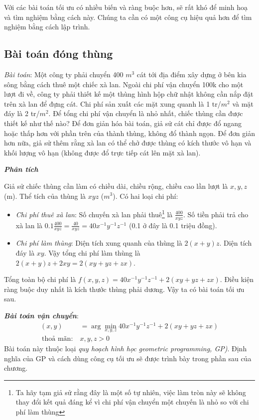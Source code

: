 Với các bài toán tối ưu có nhiều biến và ràng buộc hơn, sẽ rất khó để
minh hoạ và tìm nghiệm bằng cách này. Chúng ta cần có một công cụ hiệu quả hơn để tìm nghiệm bằng cách lập trình.

\subsection{Bài toán đóng thùng}
 
\textit{Bài toán}: Một công ty phải chuyển 400 $m^3$ cát tới địa điểm xây dựng ở
bên kia sông bằng
cách thuê một chiếc xà lan. Ngoài chi phí vận chuyển 100k cho một lượt đi về, công ty  phải thiết kế một thùng hình hộp chữ nhật không cần nắp đặt trên xà
lan để đựng cát. Chi phí sản xuất các mặt xung quanh
là 1 tr/$m^2$ và mặt đáy là 2 tr/$m^2$. Để tổng chi phí vận chuyển là nhỏ nhất, chiếc thùng cần được thiết kế như thế nào? Để đơn giản hóa bài toán, giả sử cát chỉ được
đổ ngang hoặc thấp hơn với phần trên của thành thùng, không đổ thành ngọn. Để đơn giản hơn nữa, giả sử thêm rằng xà lan có thể chở được thùng có kích thước vô hạn và khối lượng vô hạn (không được đổ trực tiếp cát lên mặt xà lan). 
 
 
\textit{\textbf{Phân tích}}

Giả sử chiếc thùng cần làm có chiều dài, chiều rộng, chiều cao lần lượt là $x,
y, z$ (m). Thể tích của thùng là $xyz$ ($m^3$). Có hai loại chi phí:
\begin{itemize}
    \item \textit{Chi phí thuê xà lan}: Số chuyến xà lan phải thuê\footnote{Ta
    hãy tạm giả sử rằng đây là một số tự nhiên, việc làm tròn này sẽ không thay
    đổi kết quả đáng kể vì chi phí vận chuyển một chuyến là nhỏ so với chi phí
    làm thùng} là $\frac{400}{xyz}$. Số tiền phải trả cho xà lan là
    $\displaystyle 0.1\frac{400}{xyz} = \frac{40}{xyz} = 40x^{-1}y^{-1}z^{-1}$
    (0.1 ở đây là 0.1 triệu đồng).
    \item \textit{Chi phí làm thùng}: Diện tích xung quanh của thùng là $2 (x +
    y)z $. Diện tích đáy là $xy$. Vậy tổng chi phí làm thùng là $2(x +y)z + 2xy
    = 2(xy + yz + zx)$.
\end{itemize}
 
Tổng toàn bộ chi phí là $f(x, y, z) = 40x^{-1}y^{-1}z^{-1} + 2(xy + yz + zx)$.
Điều kiện ràng buộc duy nhất là kích thước thùng phải dương. Vậy ta có
bài toán tối ưu sau.  


\textit{\textbf{Bài toán vận chuyển}}:
\begin{equation} 
\begin{aligned}
    (x, y) &= \arg\min_{x, y, z} 40x^{-1}y^{-1}z^{-1} + 2(xy + yz + zx) \\\ 
    \text{thoả mãn:}~ & x, y, z > 0
\end{aligned}
\end{equation} 
Bài toán này thuộc loại \textit{quy hoạch hình học} \textit{{geometric programming, GP)}}. Định nghĩa của GP
và cách dùng công cụ tối ưu sẽ được trình bày trong phần sau của chương.
 
